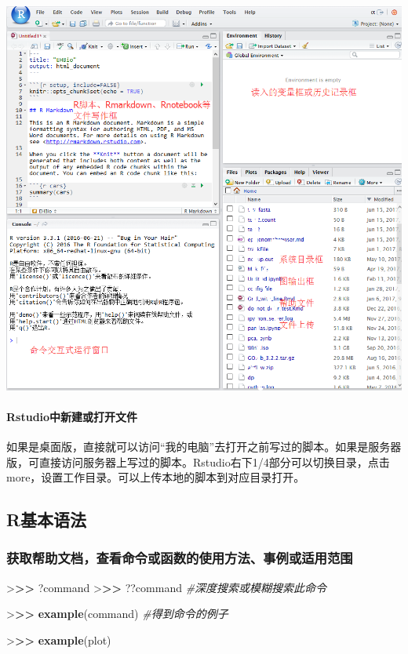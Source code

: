 \documentclass[]{article}
\newenvironment{Shaded}{\begin{snugshade}}{\end{snugshade}}
\newcommand{\KeywordTok}[1]{\textcolor[rgb]{0.13,0.29,0.53}{\textbf{{#1}}}}
\newcommand{\StringTok}[1]{\textcolor[rgb]{0.31,0.60,0.02}{{#1}}}
\newcommand{\CommentTok}[1]{\textcolor[rgb]{0.56,0.35,0.01}{\textit{{#1}}}}
\newcommand{\ErrorTok}[1]{\textcolor[rgb]{0.64,0.00,0.00}{\textbf{{#1}}}}
\newcommand{\NormalTok}[1]{{#1}}
\numberwithin{figure}{section}
\numberwithin{table}{section}
\theoremstyle{definition}
\theoremstyle{definition}
\theoremstyle{definition}
\theoremstyle{remark}
\begin{document}
\begin{center}\includegraphics[width=0.95\linewidth,height=0.7\textheight,keepaspectratio]{images/Rstudio_IDE} \end{center}

\paragraph{Rstudio中新建或打开文件}\label{rstudio}

如果是桌面版，直接就可以访问``我的电脑''去打开之前写过的脚本。如果是服务器版，可直接访问服务器上写过的脚本。Rstudio右下1/4部分可以切换目录，点击more，设置工作目录。可以上传本地的脚本到对应目录打开。

\subsection{R基本语法}\label{r}

\subsubsection{获取帮助文档，查看命令或函数的使用方法、事例或适用范围}

\begin{Shaded}
\begin{Highlighting}[]
\NormalTok{>}\ErrorTok{>>}\StringTok{ }\NormalTok{?command}
\NormalTok{>}\ErrorTok{>>}\StringTok{ }\NormalTok{??command }\CommentTok{#深度搜索或模糊搜索此命令}

\NormalTok{>}\ErrorTok{>>}\StringTok{ }\KeywordTok{example}\NormalTok{(command) }\CommentTok{#得到命令的例子}

\NormalTok{>}\ErrorTok{>>}\StringTok{ }\KeywordTok{example}\NormalTok{(plot)}
\end{Highlighting}
\end{Shaded}
\end{document}
